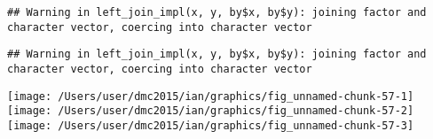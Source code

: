 \documentclass[10pt]{report}
\newenvironment{Shaded}{}{}
\newcommand{\KeywordTok}[1]{\textcolor[rgb]{0.00,0.44,0.13}{\textbf{{#1}}}}
\newcommand{\DataTypeTok}[1]{\textcolor[rgb]{0.56,0.13,0.00}{{#1}}}
\newcommand{\StringTok}[1]{\textcolor[rgb]{0.25,0.44,0.63}{{#1}}}
\newcommand{\NormalTok}[1]{{#1}}
\begin{document}
\begin{verbatim}
## Warning in left_join_impl(x, y, by$x, by$y): joining factor and character vector, coercing into character vector
\end{verbatim}

\begin{Shaded}
\end{Shaded}

\begin{verbatim}
## Warning in left_join_impl(x, y, by$x, by$y): joining factor and character vector, coercing into character vector
\end{verbatim}

\begin{Shaded}
\end{Shaded}

\begin{center}\texttt{[image: /Users/user/dmc2015/ian/graphics/fig\_unnamed-chunk-57-1]} \texttt{[image: /Users/user/dmc2015/ian/graphics/fig\_unnamed-chunk-57-2]} \texttt{[image: /Users/user/dmc2015/ian/graphics/fig\_unnamed-chunk-57-3]} \end{center}
\end{document}
